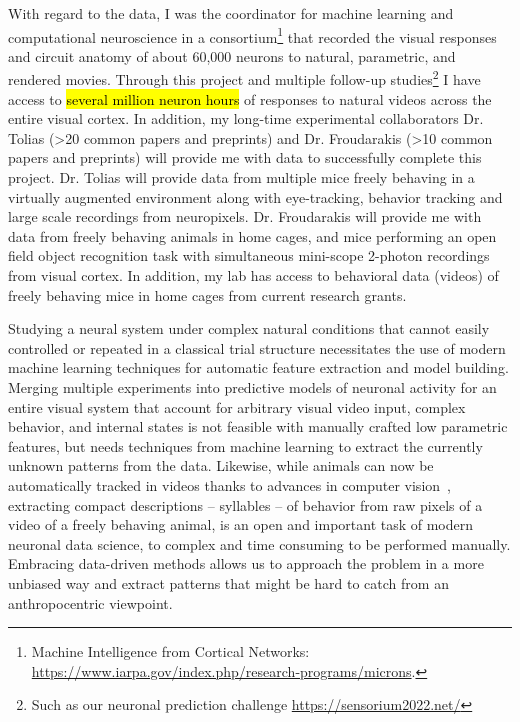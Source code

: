\documentclass[COG,11pt]{ercgrant}
\begin{document}
With regard to the data, I was the coordinator for machine learning and computational neuroscience in a consortium\footnote{Machine Intelligence from Cortical Networks: \url{https://www.iarpa.gov/index.php/research-programs/microns}.} that recorded the visual responses and circuit anatomy of about 60,000 neurons to natural, parametric, and rendered movies. Through this project and multiple follow-up studies\footnote{Such as our neuronal prediction challenge \url{https://sensorium2022.net/}} I have access to \hl{several million neuron hours} of responses to natural videos across the entire visual cortex. In addition, my long-time experimental collaborators Dr. Tolias (>20 common papers and preprints) and Dr. Froudarakis (>10 common papers and preprints) will provide me with data to successfully complete this project. Dr. Tolias will provide data from multiple mice freely behaving in a virtually augmented environment along with eye-tracking, behavior tracking and large scale recordings from neuropixels. Dr. Froudarakis will provide me with data from freely behaving animals in home cages, and mice performing an open field object recognition task with simultaneous mini-scope 2-photon recordings from visual cortex. 
In addition, my lab has access to behavioral data (videos) of freely behaving mice in home cages from current research grants. 

Studying a neural system under complex natural conditions that cannot easily controlled or repeated in a classical trial structure necessitates the use of modern machine learning techniques for automatic feature extraction and model building. Merging multiple experiments into predictive models of neuronal activity for an entire visual system that account for arbitrary visual video input, complex behavior, and internal states is not feasible with manually crafted low parametric features, but needs techniques from machine learning to extract the currently unknown patterns from the data. Likewise, while animals can now be automatically tracked in videos thanks to advances in computer vision~\parencite{Mathis2018-lk}, extracting compact descriptions -- syllables -- of behavior from raw pixels of a video of a freely behaving animal, is an open and important task of modern neuronal data science, to complex and time consuming to be performed manually. Embracing data-driven methods allows us to approach the problem in a more unbiased way and extract patterns that might be hard to catch from an anthropocentric viewpoint. 
\end{document}
